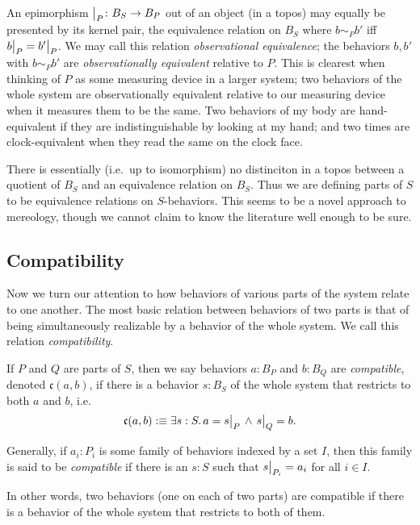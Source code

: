 An epimorphism $\big|_{P}\colon B_S\to B_P$ out of an object (in a topos) may equally be presented by its kernel pair, the equivalence relation on $B_S$ where $b\sim_P b'$ iff $b\big|_{P}=b'\big|_{P}$. We may call this relation \emph{observational equivalence}; the behaviors $b,b'$ with $b\sim_Pb'$ are \emph{observationally equivalent} relative to $P$. This is clearest when thinking of $P$ as some measuring device in a larger system; two behaviors of the whole system are observationally equivalent relative to our measuring device when it measures them to be the same. Two behaviors of my body are hand-equivalent if they are indistinguishable by looking at my hand; and two times are clock-equivalent when they read the same on the clock face.

There is essentially (i.e.\ up to isomorphism) no distinciton in a topos between a quotient of $B_S$ and an equivalence relation on $B_S$. Thus we are defining parts of $S$ to be equivalence relations on $S$-behaviors. This seems to be a novel approach to mereology, though we cannot claim to know the literature well enough to be sure.

\subsection{Compatibility}

Now we turn our attention to how behaviors of various parts of the system relate to one another. The most basic relation between behaviors of two parts is that of being simultaneously realizable by a behavior of the whole system. We call this relation \emph{compatibility}.

\begin{defn}
If $P$ and $Q$ are parts of $S$, then we say behaviors $a : B_P$ and $b : B_Q$ are \emph{compatible}, denoted $\mathfrak{c}(a, b)$, if there is a behavior $s : B_S$ of the whole system that restricts to both $a$ and $b$, i.e.\
$$\mathfrak{c}(a, b) :\equiv \exists s : S.\, a = s\big|_{P}\, \wedge\, s\big|_{Q} = b.$$

Generally, if $a_i : P_i$ is some family of behaviors indexed by a set $I$, then this family is said to be \emph{compatible} if there is an $s : S$ such that $s\big|_{P_i} = a_i$ for all $i\in I$.
\end{defn}

In other words, two behaviors (one on each of two parts) are compatible if there is a behavior of the whole system that restricts to both of them. 

